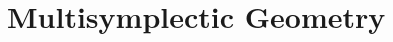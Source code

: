 \documentclass[handout,10pt]{beamer}
\begin{document}
    
    \section{Multisymplectic Geometry}
    \checkpoint
    
\end{document}
